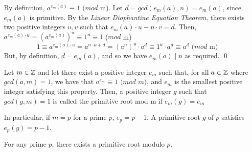 \documentclass[../main.tex]{subfiles}
\begin{document}
\begin{pf}
    By definition, $a^{e_m(a)} \equiv 1$ $(mod$ m). Let $d = gcd(e_m(a), n)=e_m(a)$, since $e_m(a)$ is primitive. \sspace
    By the \textit{Linear Diophantine Equation Theorem}, there exists two positive integers $u,v$ such that $e_m(a)\cdot u - n \cdot v = d$. Then, $a^{e_m(a)\cdot u}=(a^{e_m(a)})^u \equiv 1^u \equiv 1$ ($mod$ m) $$1 \equiv a^{e_m(a)\cdot u} = a^{n\cdot u + d} = (a^n)^u \cdot a^d \equiv 1^u \cdot a^d \equiv a^d \text{ (}mod \text{ m)}$$
    But, by definition, $d=e_m(a)$, and so we have $e_m(a) \mid n$ as required. \qed
\end{pf}
\begin{defn}
    Let $m \in \mathbb{Z}$ and let there exist a positive integer $e_m$ such that, for all $a \in \mathbb{Z}$ where $gcd(a,m)=1$, we have that $a^{e_m} \equiv 1$ $(mod$ $m)$, and $e_m$ is the smallest positive integer satisfying this property. \sspace
    Then, a positive integer $g$ such that $gcd(g, m)=1$ is called the primitive root mod m if $e_m(g)=e_m$
\end{defn}
In particular, if $m=p$ for a prime $p$, $e_p=p-1$. A primitive root $g$ of $p$ satisfies $e_p(g)=p-1$.

\begin{thm}
    For any prime $p$, there exists a primitive root modulo $p$.
\end{thm}
\end{document}
